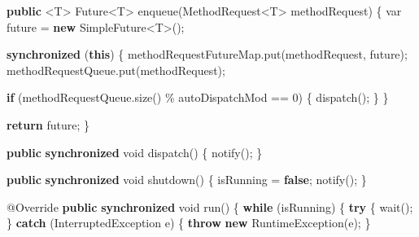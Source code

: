 \documentclass[11pt]{article}
\newenvironment{Shaded}{}{}
\newcommand{\KeywordTok}[1]{\textcolor[rgb]{0.00,0.44,0.13}{\textbf{{#1}}}}
\newcommand{\DataTypeTok}[1]{\textcolor[rgb]{0.56,0.13,0.00}{{#1}}}
\newcommand{\DecValTok}[1]{\textcolor[rgb]{0.25,0.63,0.44}{{#1}}}
\newcommand{\FunctionTok}[1]{\textcolor[rgb]{0.02,0.16,0.49}{{#1}}}
\newcommand{\NormalTok}[1]{{#1}}
\newcommand{\ControlFlowTok}[1]{\textcolor[rgb]{0.00,0.44,0.13}{\textbf{{#1}}}}
\newcommand{\OperatorTok}[1]{\textcolor[rgb]{0.40,0.40,0.40}{{#1}}}
\newcommand{\BuiltInTok}[1]{{#1}}
\newcommand{\AttributeTok}[1]{\textcolor[rgb]{0.49,0.56,0.16}{{#1}}}
\begin{document}
\begin{Shaded}
\begin{Highlighting}[]
    \KeywordTok{public} \OperatorTok{\textless{}}\NormalTok{T}\OperatorTok{\textgreater{}} \BuiltInTok{Future}\OperatorTok{\textless{}}\NormalTok{T}\OperatorTok{\textgreater{}} \FunctionTok{enqueue}\OperatorTok{(}\NormalTok{MethodRequest}\OperatorTok{\textless{}}\NormalTok{T}\OperatorTok{\textgreater{}}\NormalTok{ methodRequest}\OperatorTok{)} \OperatorTok{\{}
        \DataTypeTok{var}\NormalTok{ future }\OperatorTok{=} \KeywordTok{new}\NormalTok{ SimpleFuture}\OperatorTok{\textless{}}\NormalTok{T}\OperatorTok{\textgreater{}();}

        \KeywordTok{synchronized} \OperatorTok{(}\KeywordTok{this}\OperatorTok{)} \OperatorTok{\{}
\NormalTok{            methodRequestFutureMap}\OperatorTok{.}\FunctionTok{put}\OperatorTok{(}\NormalTok{methodRequest}\OperatorTok{,}\NormalTok{ future}\OperatorTok{);}
\NormalTok{            methodRequestQueue}\OperatorTok{.}\FunctionTok{put}\OperatorTok{(}\NormalTok{methodRequest}\OperatorTok{);}

            \ControlFlowTok{if} \OperatorTok{(}\NormalTok{methodRequestQueue}\OperatorTok{.}\FunctionTok{size}\OperatorTok{()} \OperatorTok{\%}\NormalTok{ autoDispatchMod }\OperatorTok{==} \DecValTok{0}\OperatorTok{)} \OperatorTok{\{}
                \FunctionTok{dispatch}\OperatorTok{();}
            \OperatorTok{\}}
        \OperatorTok{\}}

        \ControlFlowTok{return}\NormalTok{ future}\OperatorTok{;}
    \OperatorTok{\}}

    \KeywordTok{public} \KeywordTok{synchronized} \DataTypeTok{void} \FunctionTok{dispatch}\OperatorTok{()} \OperatorTok{\{}
        \FunctionTok{notify}\OperatorTok{();}
    \OperatorTok{\}}

    \KeywordTok{public} \KeywordTok{synchronized} \DataTypeTok{void} \FunctionTok{shutdown}\OperatorTok{()} \OperatorTok{\{}
\NormalTok{        isRunning }\OperatorTok{=} \KeywordTok{false}\OperatorTok{;}
        \FunctionTok{notify}\OperatorTok{();}
    \OperatorTok{\}}

    \AttributeTok{@Override}
    \KeywordTok{public} \KeywordTok{synchronized} \DataTypeTok{void} \FunctionTok{run}\OperatorTok{()} \OperatorTok{\{}
        \ControlFlowTok{while} \OperatorTok{(}\NormalTok{isRunning}\OperatorTok{)} \OperatorTok{\{}
            \ControlFlowTok{try} \OperatorTok{\{}
                \FunctionTok{wait}\OperatorTok{();}
            \OperatorTok{\}} \ControlFlowTok{catch} \OperatorTok{(}\BuiltInTok{InterruptedException}\NormalTok{ e}\OperatorTok{)} \OperatorTok{\{}
                \ControlFlowTok{throw} \KeywordTok{new} \BuiltInTok{RuntimeException}\OperatorTok{(}\NormalTok{e}\OperatorTok{);}
            \OperatorTok{\}}


\end{Highlighting}
\end{Shaded}
\end{document}
